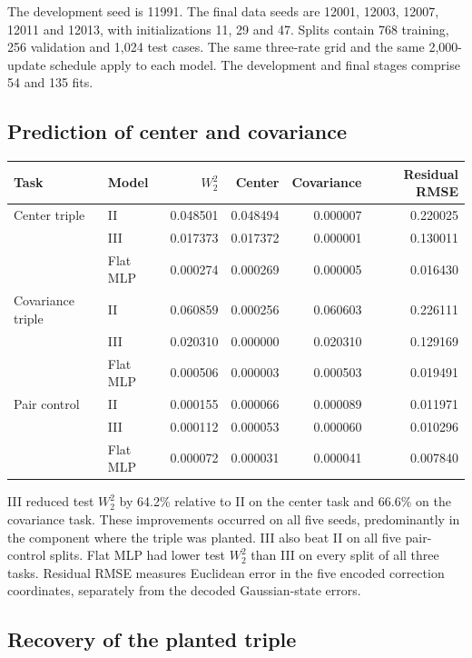\documentclass[11pt]{article}
\numberwithin{equation}{section}
\begin{document}
The development seed is 11991. The final data seeds are 12001, 12003,
12007, 12011 and 12013, with initializations 11, 29 and 47. Splits
contain 768 training, 256 validation and 1,024 test cases. The same
three-rate grid and the same 2,000-update schedule apply to each model.
The development and final stages comprise 54 and 135 fits.

\subsection{Prediction of center and covariance}

\begin{center}
\small
\begin{tabularx}{\linewidth}{@{} Y l r r r r @{}}
\toprule
\textbf{Task} & \textbf{Model} & \textbf{\(W_2^2\)} & \textbf{Center} & \textbf{Covariance} & \textbf{Residual RMSE} \\
\midrule
Center triple & II & 0.048501 & 0.048494 & 0.000007 & 0.220025 \\
 & III & 0.017373 & 0.017372 & 0.000001 & 0.130011 \\
 & Flat MLP & 0.000274 & 0.000269 & 0.000005 & 0.016430 \\
Covariance triple & II & 0.060859 & 0.000256 & 0.060603 & 0.226111 \\
 & III & 0.020310 & 0.000000 & 0.020310 & 0.129169 \\
 & Flat MLP & 0.000506 & 0.000003 & 0.000503 & 0.019491 \\
Pair control & II & 0.000155 & 0.000066 & 0.000089 & 0.011971 \\
 & III & 0.000112 & 0.000053 & 0.000060 & 0.010296 \\
 & Flat MLP & 0.000072 & 0.000031 & 0.000041 & 0.007840 \\
\bottomrule
\end{tabularx}
\end{center}

III reduced test \(W_2^2\) by 64.2\% relative to II on the center task
and 66.6\% on the covariance task. These improvements occurred on all
five seeds, predominantly in the component where the triple was
planted. III also beat II on all five pair-control splits. Flat MLP
had lower test \(W_2^2\) than III on every split of all three tasks.
Residual RMSE measures Euclidean error in the five encoded correction
coordinates, separately from the decoded Gaussian-state errors.

\subsection{Recovery of the planted triple}
\end{document}
